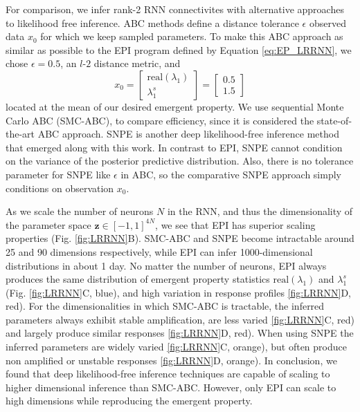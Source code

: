 \documentclass[11pt]{article}
\begin{document}
For comparison, we infer rank-2 RNN connectivites with alternative approaches to likelihood free inference.
ABC methods define a distance tolerance $\epsilon$ observed data $x_0$ for which we keep sampled parameters.
To make this ABC approach as similar as possible to the EPI program defined by Equation \ref{eq:EP_LRRNN}, we chose $\epsilon = 0.5$, an $l$-$2$ distance metric, and 
\begin{equation}\label{eq:SNPE_stab_amp_x0}
x_0 = \begin{bmatrix} \text{real}(\lambda_1) \\ \lambda^s_1 \end{bmatrix} = \begin{bmatrix} 0.5 \\ 1.5 \end{bmatrix}
\end{equation}
located at the mean of our desired emergent property.
We use sequential Monte Carlo ABC (SMC-ABC), to compare efficiency, since it is considered the state-of-the-art ABC approach.
SNPE \cite{gonccalves2019training} is another deep likelihood-free inference method that emerged along with this work.
In contrast to EPI, SNPE cannot condition on the variance of the posterior predictive distribution. 
Also, there is no tolerance parameter for SNPE like $\epsilon$ in ABC, so the comparative SNPE approach simply conditions on observation $x_0$.

As we scale the number of neurons $N$ in the RNN, and thus the dimensionality of the parameter space $\mathbf{z} \in [-1, 1]^{4N}$, we see that EPI has superior scaling properties (Fig. \ref{fig:LRRNN}B).
SMC-ABC and SNPE become intractable around 25 and 90 dimensions respectively, while EPI can infer 1000-dimensional distributions in about 1 day.
No matter the number of neurons, EPI always produces the same distribution of emergent property statistics $\text{real}(\lambda_1)$ and $\lambda_1^s$ (Fig. \ref{fig:LRRNN}C, blue), and high variation in response profiles \ref{fig:LRRNN}D, red).
For the dimensionalities in which SMC-ABC is tractable, the inferred parameters always exhibit stable amplification, are less varied \ref{fig:LRRNN}C, red) and largely produce similar responses \ref{fig:LRRNN}D, red).
When using SNPE the inferred parameters are widely varied \ref{fig:LRRNN}C, orange), but often produce non amplified or unstable responses \ref{fig:LRRNN}D, orange).
In conclusion, we found that deep likelihood-free inference techniques are capable of scaling to higher dimensional inference than SMC-ABC.
However, only EPI can scale to high dimensions while reproducing the emergent property.
\end{document}

